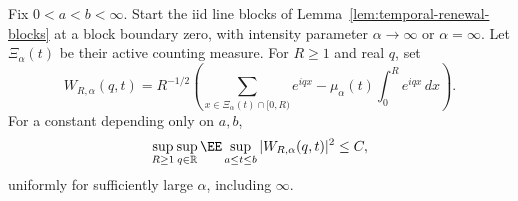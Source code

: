 \documentclass[11pt,letterpaper]{article}
\begin{document}
\begin{lemma}
\label{lem:uniform-Fourier-path-bound}
Fix $0<a<b<\infty$. Start the iid line blocks of
Lemma~\ref{lem:temporal-renewal-blocks} at a block boundary zero,
with intensity parameter $\alpha\to\infty$ or $\alpha=\infty$.
Let $\Xi_\alpha(t)$ be their active counting measure. For $R\ge1$
and real $q$, set
\[
 W_{R,\alpha}(q,t)=R^{-1/2}\left(
     \sum_{x\in\Xi_\alpha(t)\cap[0,R)}e^{iqx}
            -\mu_\alpha(t)\int_0^R e^{iqx}\,dx\right).
\]
For a constant depending only on $a,b$,
\begin{equation}\label{eq:uniform-Fourier-path-bound}
 \sup_{R\ge1}\sup_{q\in\mathbb R}
      \EE\sup_{a\le t\le b}|W_{R,\alpha}(q,t)|^2\le C,
\end{equation}
uniformly for sufficiently large $\alpha$, including $\infty$.
\end{lemma}
\end{document}
